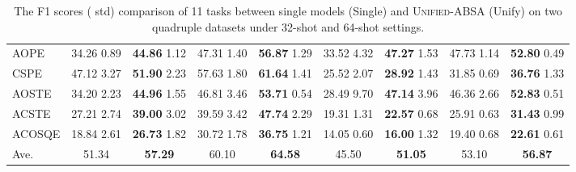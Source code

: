 \documentclass[11pt]{article}
\begin{document}
\begin{table*}[]
{\begin{tabular}{l|cccc|cccc}
AOPE                           & 34.26             \tiny{  0.89}            & \multicolumn{1}{c|}{\textbf{44.86}       \tiny{ 1.12}}       & 47.31          \tiny{ 1.40}            & \textbf{56.87}       \tiny{ 1.29}       & 33.52               \tiny{ 4.32}        & \multicolumn{1}{c|}{\textbf{47.27}       \tiny{ 1.53}}            & 47.73           \tiny{ 1.14}            & \textbf{52.80}        \tiny{ 0.49}          \\
CSPE                           & 47.12             \tiny{  3.27}            & \multicolumn{1}{c|}{\textbf{51.90}       \tiny{ 2.23} }     & 57.63           \tiny{ 1.80}            & \textbf{61.64}     \tiny{ 1.41}        & 25.52                \tiny{  2.07}        & \multicolumn{1}{c|}{\textbf{28.92}      \tiny{ 1.43}}           & 31.85           \tiny{ 0.69}            & \textbf{36.76}        \tiny{ 1.33}          \\ \midrule

AOSTE                          & 34.20             \tiny{  2.23}            & \multicolumn{1}{c|}{\textbf{44.96} \tiny{ 1.55}}                & 46.81         \tiny{ 3.46}            & \textbf{53.71}       \tiny{ 0.54}        & 28.49                \tiny{  9.70}        & \multicolumn{1}{c|}{\textbf{47.14}       \tiny{ 3.96}}      & 46.36          \tiny{  2.66}            & \textbf{52.83}       \tiny{ 0.51 }         \\
ACSTE                          & 27.21             \tiny{  2.74}            & \multicolumn{1}{c|}{\textbf{39.00} \tiny{ 3.02}}             & 39.59          \tiny{ 3.42}            & \textbf{47.74}       \tiny{ 2.29}          & 19.31               \tiny{ 1.31}        & \multicolumn{1}{c|}{\textbf{22.57}        \tiny{ 0.68}}          & 25.91           \tiny{ 0.63}            & \textbf{31.43}       \tiny{ 0.99}               \\ \midrule
ACOSQE                         & 18.84             \tiny{ 2.61}           & \multicolumn{1}{c|}{\textbf{26.73}  \tiny{1.82}}               & 30.72           \tiny{ 1.78}            & \textbf{36.75}        \tiny{1.21}               & 14.05                \tiny{ 0.60 }       & \multicolumn{1}{c|}{\textbf{16.00}        \tiny{ 1.32}}               & 19.40           \tiny{  0.68}            & \textbf{22.61}      \tiny{  0.61 }           \\ \midrule
Ave.                           & {51.34}           & \multicolumn{1}{c|}{\textbf{57.29}}          & {60.10}           & {\textbf{64.58}}           & {45.50}           & \multicolumn{1}{c|}{\textbf{51.05}}          & {53.10}           & {\textbf{56.87}}           \\ \bottomrule
\end{tabular}



}
\caption{The F1 scores ( std) comparison of 11 tasks between single models (Single) and \textsc{Unified-ABSA} (Unify) on two quadruple datasets under 32-shot and 64-shot settings. }
\label{tab:low-resource-table}
\end{table*} 
\end{document}
